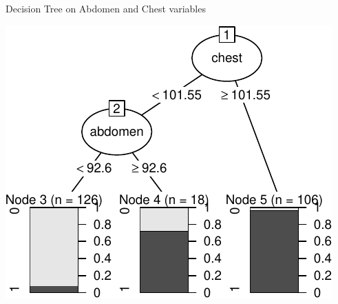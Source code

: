 \documentclass[a4paper,9pt,twocolumn,twoside,]{pinp}
\begin{document}
Decision Tree on Abdomen and Chest variables

\begin{center}\includegraphics{Executive_Report_files/figure-latex/unnamed-chunk-7-1} \end{center}





\end{document}
